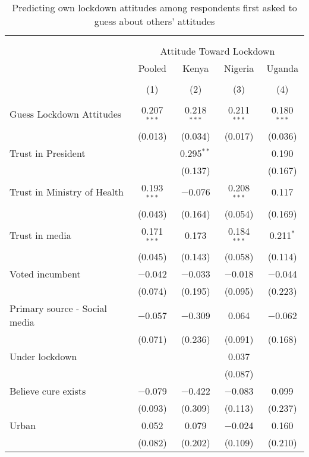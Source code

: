 
\begin{table}[!htbp] \centering 
  \caption{Predicting own lockdown attitudes among respondents first asked to guess about others’ attitudes} 
  \label{si:pred_att_lock} 
\scriptsize 
\begin{tabular}{@{\extracolsep{5pt}}lcccc} 
\\[-1.8ex]\hline 
\hline \\[-1.8ex] 
\\[-1.8ex] & \multicolumn{4}{c}{Attitude Toward Lockdown} \\ 
 & Pooled & Kenya & Nigeria & Uganda \\ 
\\[-1.8ex] & (1) & (2) & (3) & (4)\\ 
\hline \\[-1.8ex] 
 Guess Lockdown Attitudes & 0.207$^{***}$ & 0.218$^{***}$ & 0.211$^{***}$ & 0.180$^{***}$ \\ 
  & (0.013) & (0.034) & (0.017) & (0.036) \\ 
  Trust in President &  & 0.295$^{**}$ &  & 0.190 \\ 
  &  & (0.137) &  & (0.167) \\ 
  Trust in Ministry of Health & 0.193$^{***}$ & $-$0.076 & 0.208$^{***}$ & 0.117 \\ 
  & (0.043) & (0.164) & (0.054) & (0.169) \\ 
  Trust in media & 0.171$^{***}$ & 0.173 & 0.184$^{***}$ & 0.211$^{*}$ \\ 
  & (0.045) & (0.143) & (0.058) & (0.114) \\ 
  Voted incumbent & $-$0.042 & $-$0.033 & $-$0.018 & $-$0.044 \\ 
  & (0.074) & (0.195) & (0.095) & (0.223) \\ 
  Primary source - Social media & $-$0.057 & $-$0.309 & 0.064 & $-$0.062 \\ 
  & (0.071) & (0.236) & (0.091) & (0.168) \\ 
  Under lockdown &  &  & 0.037 &  \\ 
  &  &  & (0.087) &  \\ 
  Believe cure exists & $-$0.079 & $-$0.422 & $-$0.083 & 0.099 \\ 
  & (0.093) & (0.309) & (0.113) & (0.237) \\ 
  Urban & 0.052 & 0.079 & $-$0.024 & 0.160 \\ 
  & (0.082) & (0.202) & (0.109) & (0.210) \\ 

\end{tabular}
\end{table}
